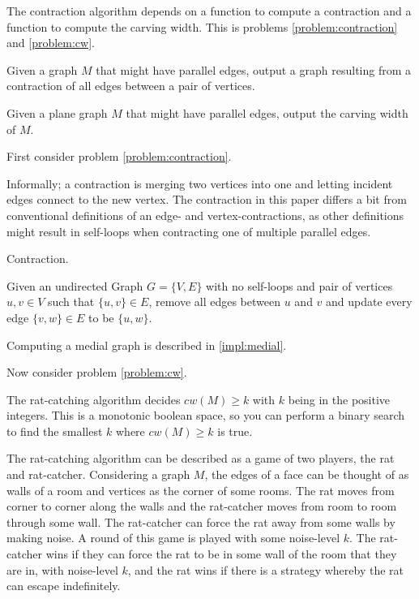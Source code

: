 \documentclass{article}
\begin{document}
	The contraction algorithm depends on a function to compute a contraction and a function to compute the carving width. This is problems \ref{problem:contraction} and \ref{problem:cw}.

	\begin{problem}\label{problem:contraction}
		Given a graph $M$ that might have parallel edges, output a graph resulting from a contraction of all edges between a pair of vertices.
	\end{problem}

	\begin{problem}\label{problem:cw}
		Given a plane graph $M$ that might have parallel edges, output the carving width of $M$.
	\end{problem}

	First consider problem \ref{problem:contraction}.

	Informally; a contraction is merging two vertices into one and letting incident edges connect to the new vertex. The contraction in this paper differs a bit from conventional definitions of an edge- and vertex-contractions, as other definitions might result in self-loops when contracting one of multiple parallel edges.

	\begin{definition}
		Contraction.

		Given an undirected Graph $G=\{V,E\}$ with no self-loops and pair of vertices $u,v \in V$ such that $\{u,v\} \in E$, remove all edges between $u$ and $v$ and update every edge $\{v,w\} \in E$ to be $\{u,w\}$.
	\end{definition}

	Computing a medial graph is described in \ref{impl:medial}.

	Now consider problem \ref{problem:cw}.

	The rat-catching algorithm decides $cw(M) \geq k$ with $k$ being in the positive integers. This is a monotonic boolean space, so you can perform a binary search to find the smallest $k$ where $cw(M) \geq k$ is true.

	The rat-catching algorithm can be described as a game of two players, the rat and rat-catcher. Considering a graph $M$, the edges of a face can be thought of as walls of a room and vertices as the corner of some rooms. The rat moves from corner to corner along the walls and the rat-catcher moves from room to room through some wall. The rat-catcher can force the rat away from some walls by making noise. A round of this game is played with some noise-level $k$. The rat-catcher wins if they can force the rat to be in some wall of the room that they are in, with noise-level $k$, and the rat wins if there is a strategy whereby the rat can escape indefinitely.
\end{document}
